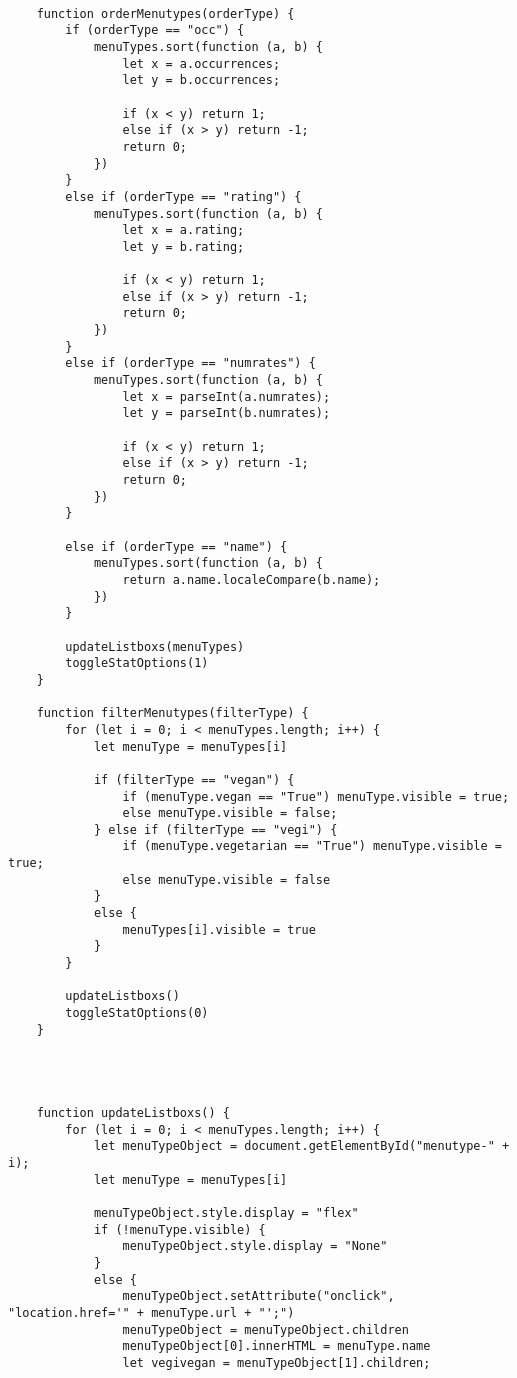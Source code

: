 \begin{lstlisting}

    function orderMenutypes(orderType) {
        if (orderType == "occ") {
            menuTypes.sort(function (a, b) {
                let x = a.occurrences;
                let y = b.occurrences;
    
                if (x < y) return 1;
                else if (x > y) return -1;
                return 0;
            })
        }
        else if (orderType == "rating") {
            menuTypes.sort(function (a, b) {
                let x = a.rating;
                let y = b.rating;
    
                if (x < y) return 1;
                else if (x > y) return -1;
                return 0;
            })
        }
        else if (orderType == "numrates") {
            menuTypes.sort(function (a, b) {
                let x = parseInt(a.numrates);
                let y = parseInt(b.numrates);
    
                if (x < y) return 1;
                else if (x > y) return -1;
                return 0;
            })
        }
    
        else if (orderType == "name") {
            menuTypes.sort(function (a, b) {
                return a.name.localeCompare(b.name);
            })
        }
    
        updateListboxs(menuTypes)
        toggleStatOptions(1)
    }
    
    function filterMenutypes(filterType) {
        for (let i = 0; i < menuTypes.length; i++) {
            let menuType = menuTypes[i]
    
            if (filterType == "vegan") {
                if (menuType.vegan == "True") menuType.visible = true;
                else menuType.visible = false;
            } else if (filterType == "vegi") {
                if (menuType.vegetarian == "True") menuType.visible = true;
                else menuType.visible = false
            }
            else {
                menuTypes[i].visible = true
            }
        }
    
        updateListboxs()
        toggleStatOptions(0)
    }
    
    
    
    
    function updateListboxs() {
        for (let i = 0; i < menuTypes.length; i++) {
            let menuTypeObject = document.getElementById("menutype-" + i);
            let menuType = menuTypes[i]
    
            menuTypeObject.style.display = "flex"
            if (!menuType.visible) {
                menuTypeObject.style.display = "None"
            }
            else {
                menuTypeObject.setAttribute("onclick", "location.href='" + menuType.url + "';")
                menuTypeObject = menuTypeObject.children
                menuTypeObject[0].innerHTML = menuType.name
                let vegivegan = menuTypeObject[1].children;
    

\end{lstlisting}
